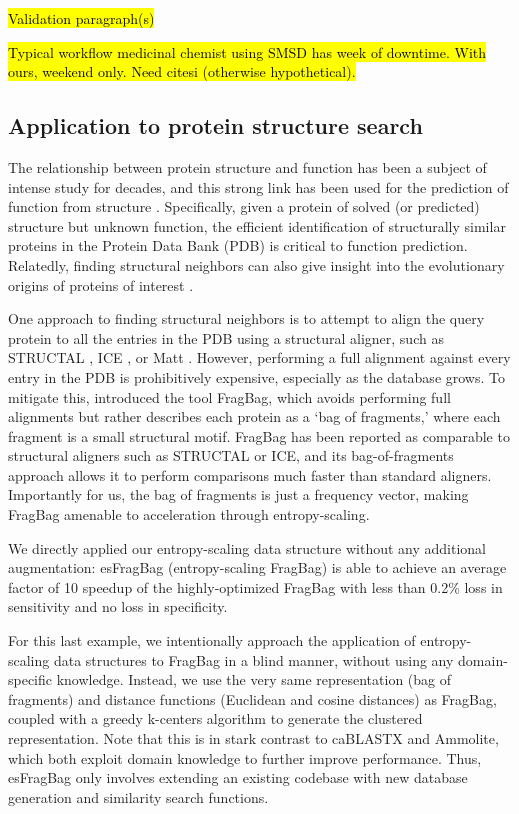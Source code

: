 \documentclass[review,preprint,12pt]{elsarticle}
\renewcommand{\cite}{\citep} %
\theoremstyle{definition}
\theoremstyle{remark}
\numberwithin{equation}{section}
\begin{document}
\hl{Validation paragraph(s)}

\hl{Typical workflow medicinal chemist using SMSD has week of downtime. With ours, weekend only. Need citesi (otherwise hypothetical).}

\subsection{Application to protein structure search}

The relationship between protein structure and function has been a subject of intense study for decades,
and this strong link has been used for the prediction of function from structure \cite{hegyi1999relationship}.
Specifically, given a protein of solved (or predicted) structure but unknown function, the efficient identification
of structurally similar proteins in the Protein Data Bank (PDB) is critical to function prediction.
Relatedly, finding structural neighbors can also give insight into the evolutionary origins of proteins of interest \cite{yona1999protomap,nepomnyachiy2014global}.

One approach to finding structural neighbors is to attempt to align the query protein to all the entries in the PDB using a structural aligner, such as 
STRUCTAL \cite{subbiah1993structural}, ICE \cite{shindyalov1998protein}, or 
Matt \cite{menke2008matt}.
However, performing a full alignment against every entry in the PDB is prohibitively expensive, especially as the database grows.
To mitigate this, \citep{budowski2010fragbag} introduced the tool FragBag, which avoids performing full alignments but rather describes each protein as a
`bag of fragments,' where each fragment is a small structural motif.
FragBag has been reported as comparable to structural aligners such as STRUCTAL or ICE,
and its bag-of-fragments approach
allows it to perform comparisons much faster than standard aligners.
Importantly for us, the bag of fragments is just a frequency vector, making
FragBag amenable to acceleration through entropy-scaling.

We directly applied our entropy-scaling data structure without any additional 
augmentation: esFragBag (entropy-scaling FragBag) is able to achieve an average
factor of 10 speedup of the highly-optimized FragBag with less than 0.2\% loss 
in sensitivity and no loss in specificity.

For this last example, we intentionally approach the application of entropy-scaling data structures to FragBag in a blind manner,
without using any domain-specific knowledge.
Instead, we use the very same representation (bag of fragments) and distance functions (Euclidean and cosine distances)
as FragBag, coupled with a greedy k-centers algorithm to generate the clustered representation.
Note that this is in stark contrast to caBLASTX and Ammolite, which both exploit domain knowledge to further improve performance.
Thus, esFragBag only involves extending an existing codebase with new database generation and similarity search functions.
\end{document}

